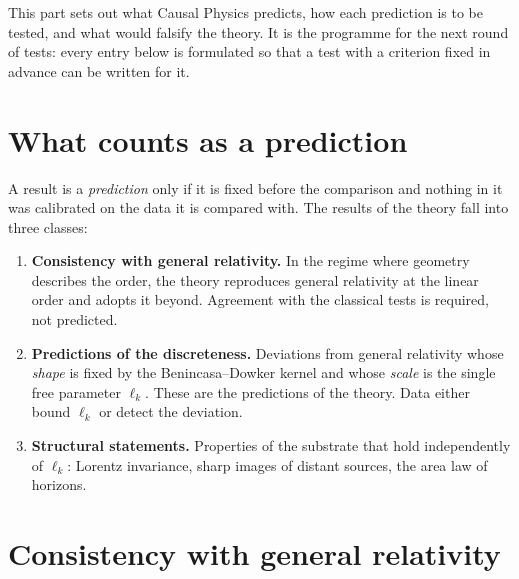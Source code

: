 
This part sets out what Causal Physics predicts, how each prediction is to be tested, and what would
falsify the theory. It is the programme for the next round of tests: every entry below is formulated so
that a test with a criterion fixed in advance can be written for it.

\section{What counts as a prediction}\label{sec:what-prediction}

A result is a \emph{prediction} only if it is fixed before the comparison and nothing in it was
calibrated on the data it is compared with. The results of the theory fall into three classes:
\begin{enumerate}
\item \textbf{Consistency with general relativity.} In the regime where geometry describes the order, the
  theory reproduces general relativity at the linear order and adopts it beyond. Agreement with the
  classical tests is required, not predicted.
\item \textbf{Predictions of the discreteness.} Deviations from general relativity whose \emph{shape} is
  fixed by the Benincasa--Dowker kernel and whose \emph{scale} is the single free parameter $\ell_k$.
  These are the predictions of the theory. Data either bound $\ell_k$ or detect the deviation.
\item \textbf{Structural statements.} Properties of the substrate that hold independently of $\ell_k$:
  Lorentz invariance, sharp images of distant sources, the area law of horizons.
\end{enumerate}

\section{Consistency with general relativity}\label{sec:consistency}

